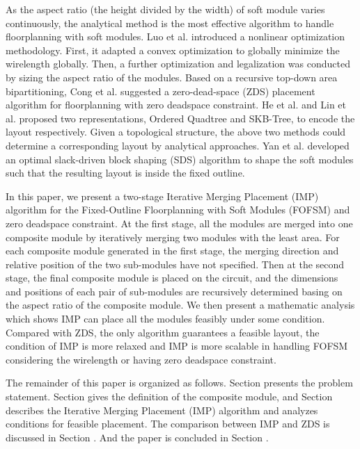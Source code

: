 \documentclass[conference]{IEEEtran}
\begin{document}
As the aspect ratio (the height divided by the width) of soft module varies continuously, the analytical method \cite{Luo,ZDS,he,SKB,SDS} is the most effective algorithm to handle floorplanning with soft modules. Luo et al. \cite{Luo} introduced a nonlinear optimization methodology. First, it adapted a convex optimization to globally minimize the wirelength globally. Then, a further optimization and legalization was conducted by sizing the aspect ratio of the modules. Based on a recursive top-down area bipartitioning, Cong et al. \cite{ZDS} suggested a zero-dead-space (ZDS) placement algorithm for floorplanning with zero deadspace constraint. He et al. \cite{he} and Lin et al. \cite{SKB} proposed two representations, Ordered Quadtree and SKB-Tree, to encode the layout respectively. Given a topological structure, the above two methods could determine a corresponding layout by analytical approaches. Yan et al. \cite{SDS} developed an optimal slack-driven block shaping (SDS) algorithm to shape the soft modules such that the resulting layout is inside the fixed outline.

In this paper, we present a two-stage Iterative Merging Placement (IMP) algorithm for the Fixed-Outline Floorplanning with Soft Modules (FOFSM) and zero deadspace constraint. At the first stage, all the modules are merged into one composite module by iteratively merging two modules with the least area. For each composite module generated in the first stage, the merging direction and relative position of the two sub-modules have not specified. Then at the second stage, the final composite module is placed on the circuit, and the dimensions and positions of each pair of sub-modules are recursively determined basing on the aspect ratio of the composite module. We then present a mathematic analysis which shows IMP can place all the modules feasibly under some condition. Compared with ZDS, the only algorithm guarantees a feasible layout, the condition of IMP is more relaxed and IMP is more scalable in handling FOFSM considering the wirelength or having zero deadspace constraint.

The remainder of this paper is organized as follows. Section \uppercase\expandafter{} presents the problem statement. Section \uppercase\expandafter{} gives the definition of the composite module, and Section \uppercase\expandafter{} describes the Iterative Merging Placement (IMP) algorithm and analyzes conditions for feasible placement. The comparison between IMP and ZDS is discussed in Section \uppercase\expandafter{}. And the paper is concluded in Section \uppercase\expandafter{}.
\end{document}
